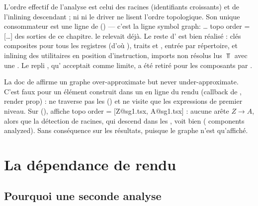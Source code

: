 \begin{decision}
L'ordre effectif de l'analyse est celui des racines (identifiants croissants) et de l'inlining
descendant ; ni  ni le driver ne lisent l'ordre topologique. Son unique
consommateur est une ligne de  () --- c'est la
ligne \og symbol graph: … topo order = […]\fg{} des sorties de ce chapitre.  le relevait
déjà. Le reste d' est bien réalisé : clés composites  pour tous
les registres (d'où ), traits  et ,
entrée par répertoire,  et inlining des utilitaires en position d'instruction,
imports non résolus lus $\Top$ avec une \Info. Le repli , qu' acceptait
comme limite, a été retiré pour les composants par .
\end{decision}

\begin{piege}
La doc de  affirme un graphe \og over-approximate but never under-approximate\fg.
C'est faux pour un élément construit dans un  en ligne du rendu (callback de
, render prop) :  ne traverse pas les 
() et  ne visite que les
expressions de premier niveau. Sur 
(), 
affiche \og topo order = [Z@sg1.tsx, A@sg1.tsx]\fg{} : aucune arête $Z \to A$, alors que la
détection de racines, qui descend dans les , voit bien  ( components
analyzed\fg). Sans conséquence sur les résultats, puisque le graphe n'est qu'affiché.
\end{piege}

\section{La dépendance de rendu}
\label{sec:inter-composants-render-deps}

\subsection{Pourquoi une seconde analyse}

